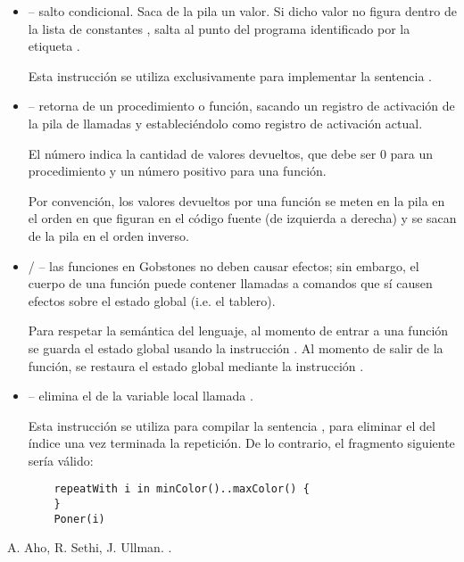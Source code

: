 \documentclass{article}
\begin{document}
\begin{itemize}
\item {} --
salto condicional. Saca de la pila un valor.
Si dicho valor no figura dentro de la lista de
constantes , salta al punto del programa
identificado por la etiqueta .

Esta instrucci\'on se utiliza exclusivamente
para implementar la sentencia .

\item {} --
retorna de un procedimiento o funci\'on,
sacando un registro de activaci\'on de la
pila de llamadas y estableci\'endolo como
registro de activaci\'on actual.

El n\'umero  indica la cantidad de
valores devueltos, que debe ser 0 para un
procedimiento y un n\'umero positivo para una
funci\'on.

Por convenci\'on, los valores devueltos por una
funci\'on se meten en la pila en el orden en que
figuran en el c\'odigo fuente (de izquierda a derecha)
y se sacan de la pila en el orden inverso.

\item {} /  --
las funciones en Gobstones no deben causar efectos;
sin embargo, el cuerpo de una funci\'on puede contener
llamadas a comandos que s\'i causen efectos sobre el
estado global (i.e. el tablero).

Para respetar la sem\'antica del lenguaje, al
momento de entrar a una funci\'on se guarda
el estado global usando la instrucci\'on
. Al momento de salir de la funci\'on,
se restaura el estado global mediante la instrucci\'on
.

\item {} -- elimina el 
de la variable local llamada .

Esta instrucci\'on se utiliza para compilar la sentencia
, para eliminar el 
del \'indice una vez terminada la repetici\'on.
De lo contrario, el fragmento siguiente
ser\'ia v\'alido:
\begin{verbatim}
    repeatWith i in minColor()..maxColor() {
    }
    Poner(i)
\end{verbatim}

\end{itemize}


\newpage
\begin{thebibliography}{BLM05}
\bibitem[1]{}
A. Aho, R. Sethi, J. Ullman.
.
\end{thebibliography}

  
\end{document}
